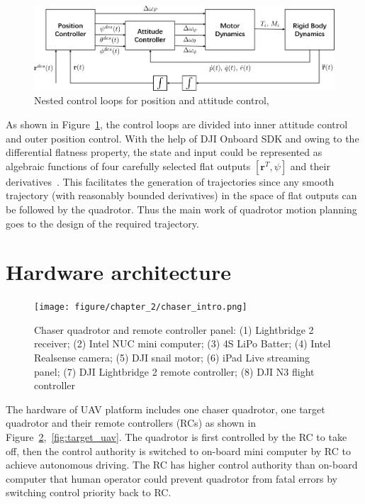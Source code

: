 \begin{figure}[htb]
  \centering
  \includegraphics[width=1.0\textwidth]{figure/chapter_2/nest.png}
  \caption{Nested control loops for position and attitude control,~\cite{GRASP}}
  \label{fig:nest}
\end{figure}

As shown in Figure~\ref{fig:nest}, the control loops are divided into inner attitude control and outer position control. With the help of DJI Onboard SDK and owing to the differential flatness property, the state and input could be represented as algebraic functions of four carefully selected flat outputs $[\mathbf{r}^T, \psi]$ and their derivatives~\cite{Snap}. This facilitates the generation of trajectories since any smooth trajectory (with reasonably bounded derivatives) in the space of flat outputs can be followed by the quadrotor. Thus the main work of quadrotor motion planning goes to the design of the required trajectory.

\section{Hardware architecture}\label{hardware}

\begin{figure}[ht]
  \centering
  \texttt{[image: figure/chapter\_2/chaser\_intro.png]}
  \caption{Chaser quadrotor and remote controller panel: (1) Lightbridge 2 receiver; (2) Intel NUC mini computer; (3) 4S LiPo Batter; (4) Intel Realsense camera; (5) DJI snail motor; (6) iPad Live streaming panel; (7) DJI Lightbridge 2 remote controller; (8) DJI N3 flight controller}
  \label{fig:quadrotor_controller}
\end{figure}

The hardware of UAV platform includes one chaser quadrotor, one target quadrotor and their remote controllers (RCs) as shown in Figure~\ref{fig:quadrotor_controller},~\ref{fig:target_uav}. The quadrotor is first controlled by the RC to take off, then the control authority is switched to on-board mini computer by RC to achieve autonomous driving. The RC has higher control authority than on-board computer that human operator could prevent quadrotor from fatal errors by switching control priority back to RC.

